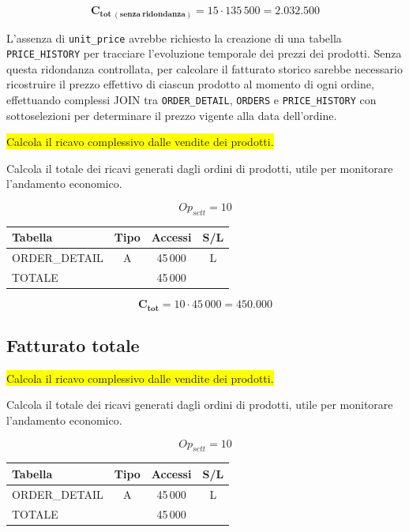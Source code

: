 \documentclass[a4paper,12pt]{report}
\begin{document}
$$\mathbf{C_{tot\ (senza\ ridondanza)}} = 15 \cdot 135\,500 = \mathbf{2.032.500}$$

L'assenza di \texttt{unit\_price} avrebbe richiesto la creazione di una tabella \texttt{PRICE\_HISTORY} per tracciare l'evoluzione temporale dei prezzi dei prodotti. Senza questa ridondanza controllata, per calcolare il fatturato storico sarebbe necessario ricostruire il prezzo effettivo di ciascun prodotto al momento di ogni ordine, effettuando complessi JOIN tra \texttt{ORDER\_DETAIL}, \texttt{ORDERS} e \texttt{PRICE\_HISTORY} con sottoselezioni per determinare il prezzo vigente alla data dell'ordine.


\colorbox{yellow}{Calcola il ricavo complessivo dalle vendite dei prodotti.}

Calcola il totale dei ricavi generati dagli ordini di prodotti, utile
per monitorare l'andamento economico.

$$Op_{sett} = 10$$

\begin{table}[H]
  \centering
  \small
  \renewcommand{\arraystretch}{1.15}
  \begin{tabularx}{0.9\textwidth}{|X|c|c|c|}
    \hline
    \rowcolor{gray!20}
    \textbf{Tabella} & \textbf{Tipo} & \textbf{Accessi} & \textbf{S/L} \\
    \hline
    ORDER\_DETAIL & A & 45\,000 & L \\
    \hline
    \rowcolor{gray!20}
    TOTALE & & 45\,000 & \\
    \hline
  \end{tabularx}
  \vspace{-1em}
\end{table}
$$\mathbf{C_{tot}} = 10 \cdot 45\,000 = \mathbf{450.000}$$

\subsection*{Fatturato totale} \label{op5}

\colorbox{yellow}{Calcola il ricavo complessivo dalle vendite dei prodotti.}

Calcola il totale dei ricavi generati dagli ordini di prodotti, utile
per monitorare l'andamento economico.

$$Op_{sett} = 10$$

\begin{table}[H]
  \centering
  \small
  \renewcommand{\arraystretch}{1.15}
  \begin{tabularx}{0.9\textwidth}{|X|c|c|c|}
    \hline
    \rowcolor{gray!20}
    \textbf{Tabella} & \textbf{Tipo} & \textbf{Accessi} & \textbf{S/L} \\
    \hline
    ORDER\_DETAIL & A & 45\,000 & L \\
    \hline
    \rowcolor{gray!20}
    TOTALE & & 45\,000 & \\
    \hline
  \end{tabularx}
  \vspace{-1em}
\end{table}
\end{document}

